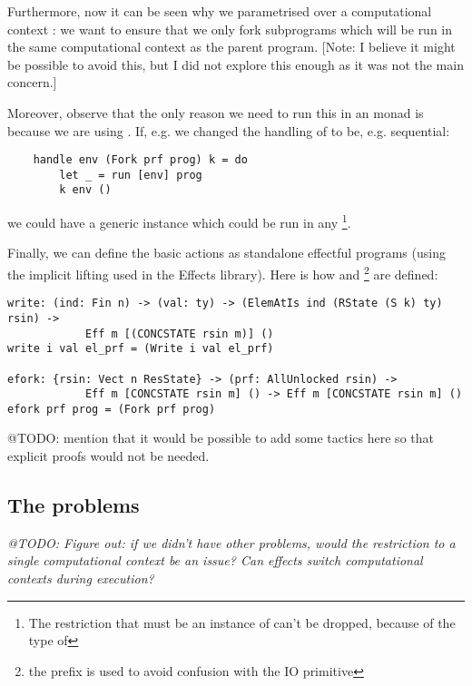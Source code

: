 Furthermore, now it can be seen why we parametrised  over
a computational context : we want to ensure that we only
fork  subprograms which will be run in the same computational
context as the parent  program. [Note: I believe it might be
possible to avoid this, but I did not explore this enough as it was not the
main concern.]

Moreover, observe that the only reason we need to run this in an 
monad is because we are using . If, e.g. we changed the handling of
 to be, e.g. sequential:

\begin{verbatim}
    handle env (Fork prf prog) k = do
        let _ = run [env] prog
        k env ()
\end{verbatim}

we could have a generic instance which could be run in any \footnote{The restriction that  must be an instance of
 can't be dropped, because of the type of }.

Finally, we can define the basic actions as standalone effectful programs
(using the implicit lifting used in the Effects library). Here is how
 and \footnote{the  prefix is used to avoid
confusion with the IO primitive } are defined:

\begin{verbatim}
write: (ind: Fin n) -> (val: ty) -> (ElemAtIs ind (RState (S k) ty) rsin) ->
            Eff m [(CONCSTATE rsin m)] ()
write i val el_prf = (Write i val el_prf)

efork: {rsin: Vect n ResState} -> (prf: AllUnlocked rsin) ->
            Eff m [CONCSTATE rsin m] () -> Eff m [CONCSTATE rsin m] ()
efork prf prog = (Fork prf prog)
\end{verbatim}

@TODO: mention that it would be possible to add some tactics here so that
explicit proofs would not be needed.

\subsection{The problems}

\emph{@TODO: Figure out: if we didn't have other problems, would the
restriction to a single computational context be an issue? Can effects switch
computational contexts during execution?}
